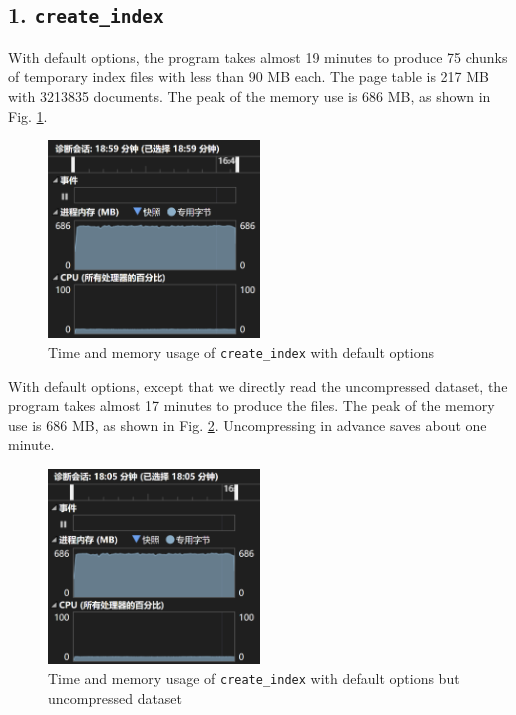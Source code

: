\documentclass[12pt]{article}
\begin{document}
\hypertarget{1-createindex-3}{%
\subsection{\texorpdfstring{1.
\texttt{create\_index}}{1. create\_index}}\label{1-createindex-3}}

With default options, the program takes almost 19 minutes to produce 75
chunks of temporary index files with less than 90 MB each. The page table
is 217 MB with 3213835 documents. The peak of the memory use is 686 MB, as
shown in Fig. \ref{create_vbyte_zipped}.

\begin{figure}
  \centering
  \includegraphics[width=0.5\textwidth]{readme.assets/image-20231107015648204.png}
  \caption{Time and memory usage of \texttt{create\_index} with
  default options}
  \label{create_vbyte_zipped}
\end{figure}

With default options, except that we directly read the uncompressed
dataset, the program takes almost 17 minutes to produce the files. The
peak of the memory use is 686 MB, as shown in Fig. \ref{create_vbyte}. Uncompressing in
advance saves about one minute.

\begin{figure}[!h]
  \centering
  \includegraphics[width=0.5\textwidth]{readme.assets/image-20231107051503452.png}
  \caption{Time and memory usage of \texttt{create\_index} with default options but uncompressed dataset}
  \label{create_vbyte}
\end{figure}
\end{document}
